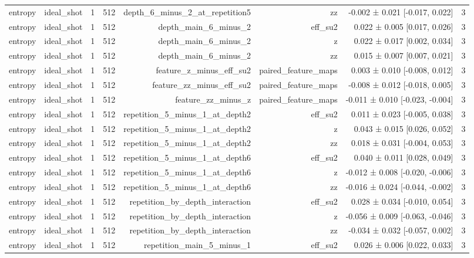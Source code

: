 \begin{table}
\begin{tabular}{lrrrrrrr}
entropy & ideal\_shot & 1 & 512 & depth\_6\_minus\_2\_at\_repetition5 & zz & -0.002 ± 0.021 [-0.017, 0.022] & 3 \\
entropy & ideal\_shot & 1 & 512 & depth\_main\_6\_minus\_2 & eff\_su2 & 0.022 ± 0.005 [0.017, 0.026] & 3 \\
entropy & ideal\_shot & 1 & 512 & depth\_main\_6\_minus\_2 & z & 0.022 ± 0.017 [0.002, 0.034] & 3 \\
entropy & ideal\_shot & 1 & 512 & depth\_main\_6\_minus\_2 & zz & 0.015 ± 0.007 [0.007, 0.021] & 3 \\
entropy & ideal\_shot & 1 & 512 & feature\_z\_minus\_eff\_su2 & paired\_feature\_maps & 0.003 ± 0.010 [-0.008, 0.012] & 3 \\
entropy & ideal\_shot & 1 & 512 & feature\_zz\_minus\_eff\_su2 & paired\_feature\_maps & -0.008 ± 0.012 [-0.018, 0.005] & 3 \\
entropy & ideal\_shot & 1 & 512 & feature\_zz\_minus\_z & paired\_feature\_maps & -0.011 ± 0.010 [-0.023, -0.004] & 3 \\
entropy & ideal\_shot & 1 & 512 & repetition\_5\_minus\_1\_at\_depth2 & eff\_su2 & 0.011 ± 0.023 [-0.005, 0.038] & 3 \\
entropy & ideal\_shot & 1 & 512 & repetition\_5\_minus\_1\_at\_depth2 & z & 0.043 ± 0.015 [0.026, 0.052] & 3 \\
entropy & ideal\_shot & 1 & 512 & repetition\_5\_minus\_1\_at\_depth2 & zz & 0.018 ± 0.031 [-0.004, 0.053] & 3 \\
entropy & ideal\_shot & 1 & 512 & repetition\_5\_minus\_1\_at\_depth6 & eff\_su2 & 0.040 ± 0.011 [0.028, 0.049] & 3 \\
entropy & ideal\_shot & 1 & 512 & repetition\_5\_minus\_1\_at\_depth6 & z & -0.012 ± 0.008 [-0.020, -0.006] & 3 \\
entropy & ideal\_shot & 1 & 512 & repetition\_5\_minus\_1\_at\_depth6 & zz & -0.016 ± 0.024 [-0.044, -0.002] & 3 \\
entropy & ideal\_shot & 1 & 512 & repetition\_by\_depth\_interaction & eff\_su2 & 0.028 ± 0.034 [-0.010, 0.054] & 3 \\
entropy & ideal\_shot & 1 & 512 & repetition\_by\_depth\_interaction & z & -0.056 ± 0.009 [-0.063, -0.046] & 3 \\
entropy & ideal\_shot & 1 & 512 & repetition\_by\_depth\_interaction & zz & -0.034 ± 0.032 [-0.057, 0.002] & 3 \\
entropy & ideal\_shot & 1 & 512 & repetition\_main\_5\_minus\_1 & eff\_su2 & 0.026 ± 0.006 [0.022, 0.033] & 3 \\

\end{tabular}
\end{table}
